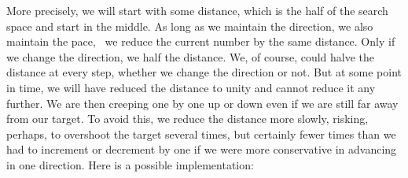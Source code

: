 \documentclass{scrreprt}
\begin{document}
More precisely, we will start with some distance,
which is the half of the search space
and start in the middle.
As long as we maintain the direction,
we also maintain the pace, \ie\ we reduce 
the current number by the same distance.
Only if we change the direction,
we half the distance.
We, of course, could halve the distance
at every step, whether we change the direction
or not. But at some point in time,
we will have reduced the distance to unity
and cannot reduce it any further.
We are then creeping one by one up or down
even if we are still far away from our target.
To avoid this, we reduce the distance
more slowly, risking, perhaps, to overshoot the target
several times, but certainly fewer times
than we had to increment or decrement by one
if we were more conservative in advancing
in one direction.
Here is a possible implementation:
\end{document}
